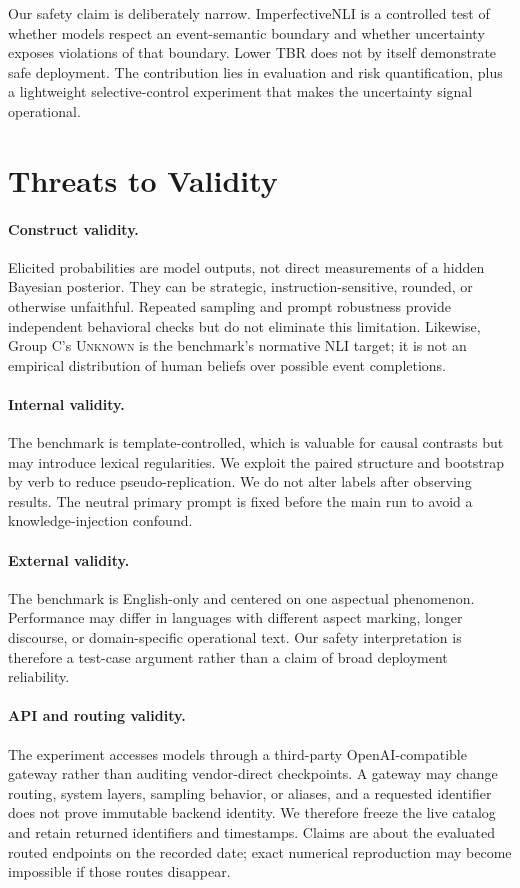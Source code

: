 \documentclass[letterpaper]{article}
\begin{document}
Our safety claim is deliberately narrow. ImperfectiveNLI is a controlled test of whether models respect an event-semantic boundary and whether uncertainty exposes violations of that boundary. Lower TBR does not by itself demonstrate safe deployment. The contribution lies in evaluation and risk quantification, plus a lightweight selective-control experiment that makes the uncertainty signal operational.

\section{Threats to Validity}
\paragraph{Construct validity.} Elicited probabilities are model outputs, not direct measurements of a hidden Bayesian posterior. They can be strategic, instruction-sensitive, rounded, or otherwise unfaithful. Repeated sampling and prompt robustness provide independent behavioral checks but do not eliminate this limitation. Likewise, Group C's \textsc{Unknown} is the benchmark's normative NLI target; it is not an empirical distribution of human beliefs over possible event completions.

\paragraph{Internal validity.} The benchmark is template-controlled, which is valuable for causal contrasts but may introduce lexical regularities. We exploit the paired structure and bootstrap by verb to reduce pseudo-replication. We do not alter labels after observing results. The neutral primary prompt is fixed before the main run to avoid a knowledge-injection confound.

\paragraph{External validity.} The benchmark is English-only and centered on one aspectual phenomenon. Performance may differ in languages with different aspect marking, longer discourse, or domain-specific operational text. Our safety interpretation is therefore a test-case argument rather than a claim of broad deployment reliability.

\paragraph{API and routing validity.} The experiment accesses models through a third-party OpenAI-compatible gateway rather than auditing vendor-direct checkpoints. A gateway may change routing, system layers, sampling behavior, or aliases, and a requested identifier does not prove immutable backend identity. We therefore freeze the live catalog and retain returned identifiers and timestamps. Claims are about the evaluated routed endpoints on the recorded date; exact numerical reproduction may become impossible if those routes disappear.
\end{document}
